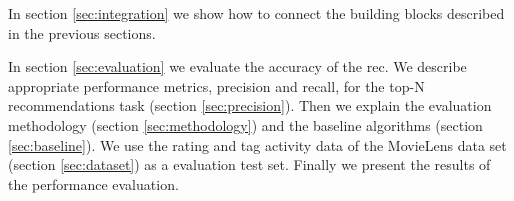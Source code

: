 In section \ref{sec:integration} we show how to connect the building blocks described in the previous sections.

In section \ref{sec:evaluation} we evaluate the accuracy of the \gls{rec}. We describe appropriate performance metrics, \gls{precision} and \gls{recall}, for the top-N recommendations task (section \ref{sec:precision}). 
Then we explain the evaluation methodology (section \ref{sec:methodology}) and the baseline algorithms (section \ref{sec:baseline}). 
We use the rating and tag activity data of the MovieLens data set (section \ref{sec:dataset}) as a evaluation test set. 
Finally we present the results of the performance evaluation. 












